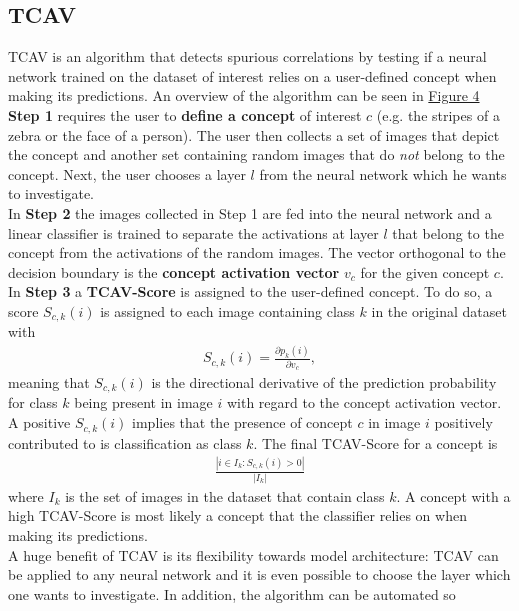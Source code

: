 \documentclass{article}
\begin{document}
\subsection{TCAV}
TCAV \cite{pmlr-v80-kim18d} is an algorithm that detects spurious correlations by testing if a neural network trained
on the dataset of interest relies on a user-defined concept when making its predictions. An overview of the algorithm
can be seen in \hyperref[fig:tcav]{Figure 4} \\
\textbf{Step 1} requires the user to \textbf{define a concept} of interest $c$ (e.g. the stripes of a zebra
or the face of a person). The user then collects a set of images that depict the concept and another set
containing random images that do \textit{not} belong to the concept. Next, the user chooses a layer $l$ from
the neural network which he wants to investigate. \\
In \textbf{Step 2} the images collected in Step 1 are fed into the neural network and a linear classifier is trained
to separate the activations at layer $l$ that belong to the concept from the activations of the random images.
The vector orthogonal to the decision boundary is the \textbf{concept activation vector} $v_c$ for the given concept $c$.\\
In \textbf{Step 3} a \textbf{TCAV-Score} is assigned to the user-defined concept. To do so, a score $S_{c,k}(i)$
is assigned to each image containing class $k$ in the original dataset with 
\begin{align*}
    S_{c,k}(i) = \frac{\partial p_k(i)}{\partial v_c},
\end{align*}
meaning that $S_{c,k}(i)$ is the directional derivative of the prediction probability for class $k$ being present
in image $i$ with regard to the concept activation vector. A positive $S_{c,k}(i)$ implies that the presence of
concept $c$ in image $i$ positively contributed to is classification as class $k$.
The final TCAV-Score for a concept is 
\begin{align*}
    \frac{|i \in I_k: S_{c,k}(i) > 0 |}{|I_k|}
\end{align*}
where $I_k$ is the set of images
in the dataset that contain class $k$. A concept with a high TCAV-Score is most likely a concept that the classifier
relies on when making its predictions. \\
A huge benefit of TCAV is its flexibility towards model architecture: TCAV can be applied to any neural network and
it is even possible to choose the layer which one wants to investigate. In addition, the algorithm can be automated so
\end{document}
